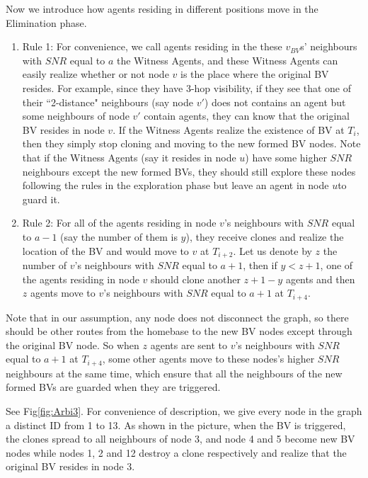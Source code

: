 Now we introduce how agents residing in different positions move in the Elimination phase.
\begin{enumerate}

\item Rule 1: For convenience, we call agents residing in the these $v_{BV}$s' neighbours with $SNR$ equal to $a$ the Witness Agents, and these Witness Agents can easily realize whether or not node $v$ is the place where the original BV resides. For example, since they have 3-hop visibility, if they see that one of their ``2-distance" neighbours (say node $v'$) does not contains an agent but some neighbours of node $v'$ contain agents, they can know that the original BV resides in node $v$. If the Witness Agents realize the existence of BV at $T_i$, then they simply stop cloning and moving to the new formed BV nodes. Note that if the Witness Agents (say it resides in node $u$) have some higher $SNR$ neighbours except the new formed BVs, they should still explore these nodes following the rules in the exploration phase but leave an agent in node $u$to guard it.  

\item Rule 2: For all of the agents residing in node $v$'s neighbours with $SNR$ equal to $a-1$ (say the number of them is $y$), they receive clones and realize the location of the BV and would move to $v$ at $T_{i+2}$. Let us denote by $z$ the number of $v$'s neighbours with $SNR$ equal to $a+1$, then if $y< z+1$, one of the agents residing in node $v$ should clone another $z+1-y$ agents and then $z$ agents move to $v$'s neighbours with $SNR$ equal to $a+1$ at $T_{i+4}$.
\end{enumerate}

Note that in our assumption, any node does not disconnect the graph, so there should be other routes from the homebase to the new BV nodes except through the original BV node. So when $z$ agents are sent to $v$'s neighbours with $SNR$ equal to $a+1$ at $T_{i+4}$, some other agents move to these nodes's higher $SNR$ neighbours at the same time, which ensure that all the neighbours of the new formed BVs are guarded when they are triggered. 

See Fig\ref{fig:Arbi3}. For convenience of description, we give every node in the graph a distinct ID from 1 to 13. As shown in the picture, when the BV is triggered, the clones spread to all neighbours of node 3, and node 4 and 5 become new BV nodes while nodes 1, 2 and 12 destroy a clone respectively and realize that the original BV resides in node 3. 

